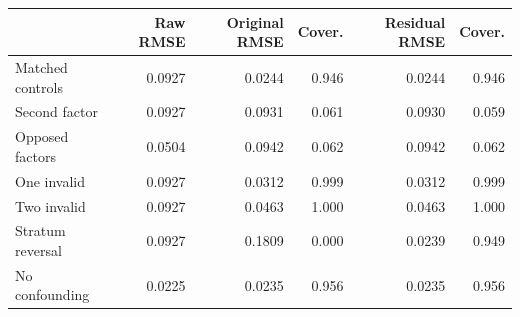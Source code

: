 \begin{tabular}{lrrrrr}\hline
 & Raw RMSE & Original RMSE & Cover. & Residual RMSE & Cover.\\\hline
Matched controls & 0.0927 & 0.0244 & 0.946 & 0.0244 & 0.946 \\
Second factor & 0.0927 & 0.0931 & 0.061 & 0.0930 & 0.059 \\
Opposed factors & 0.0504 & 0.0942 & 0.062 & 0.0942 & 0.062 \\
One invalid & 0.0927 & 0.0312 & 0.999 & 0.0312 & 0.999 \\
Two invalid & 0.0927 & 0.0463 & 1.000 & 0.0463 & 1.000 \\
Stratum reversal & 0.0927 & 0.1809 & 0.000 & 0.0239 & 0.949 \\
No confounding & 0.0225 & 0.0235 & 0.956 & 0.0235 & 0.956 \\
\hline\end{tabular}

